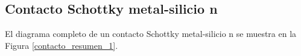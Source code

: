 







\newpage
\subsection{Contacto Schottky metal-silicio n}

El diagrama completo de un contacto Schottky metal-silicio n se muestra en la Figura \ref{contacto_resumen_1}.

